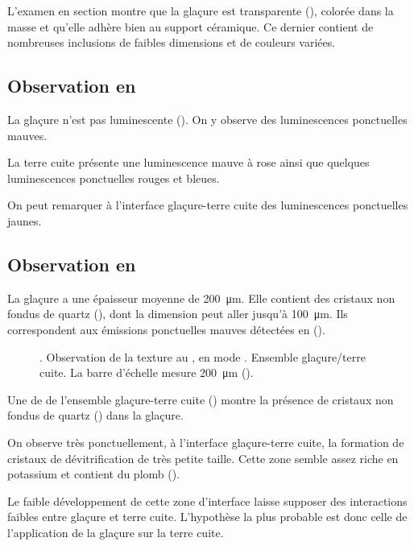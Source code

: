 L'examen en section montre que la glaçure est transparente 
(), colorée dans la masse et qu'elle 
adhère bien au support céramique. Ce dernier contient de nombreuses 
inclusions de faibles dimensions et de couleurs variées.

\subsection{Observation en \CL}
La glaçure n'est pas luminescente (). 
On y observe des luminescences ponctuelles mauves.

La terre cuite présente une luminescence mauve à rose ainsi que 
quelques luminescences ponctuelles rouges et bleues.

On peut remarquer à l'interface glaçure-terre cuite des luminescences 
ponctuelles jaunes.

\subsection{Observation en \MEB[ie]}
La glaçure a une épaisseur moyenne de \SI{200}{\um}. Elle contient 
des cristaux non fondus de quartz (\quartz), dont la dimension peut 
aller jusqu'à \SI{100}{\um}. Ils correspondent aux émissions 
ponctuelles mauves détectées en \CL ().

\begin{figure}[htb]
  \caption[\ -- Observation de la texture au \MEB, 
           en mode \ERD. Ensemble glaçure/terre cuite]
          {\legendeD.
           Observation de la texture au \MEB, en mode \ERD. 
           Ensemble glaçure/terre cuite. La barre d'échelle mesure 
           \SI{200}{\um} ().}
  \label{MEB:6531_img}
\end{figure}

Une \carto de \RX de l'ensemble glaçure-terre cuite 
() montre la présence de cristaux non 
fondus de quartz (\quartz) dans la glaçure.

On observe très ponctuellement, à l'interface glaçure-terre cuite, la 
formation de cristaux de dévitrification de très petite taille. Cette 
zone semble assez riche en potassium et contient du plomb 
().

Le faible développement de cette zone d'interface laisse supposer des 
interactions faibles entre glaçure et terre cuite. L'hypothèse la plus 
probable est donc celle de l'application de la glaçure sur la terre 
cuite.

